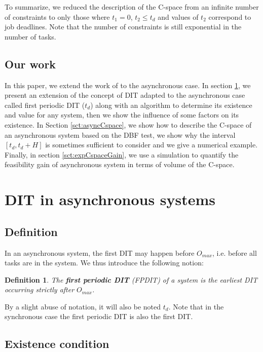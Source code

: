 \documentclass[conference]{IEEEtran}
\newtheorem{definition}{Definition}
\begin{document}
  To summarize, we reduced the description of the C-space from an infinite number
  of constraints to only those where $t_1 = 0$, $t_2 \leqslant t_d$ and
  values of $t_2$ correspond to job deadlines. Note that the number of
  constraints is still exponential in the number of tasks.

  \subsection{Our work}
    In this paper, we extend the work of \cite{george2009characterization} to the
    asynchronous case. In section \ref{sct:asyncDIT}, we present an extension of
    the concept of DIT adapted to the asynchronous case called first periodic DIT
    ($t_d$) along with an algorithm to determine its existence and value for any system,
    then we show the influence of some factors on its existence. In Section
    \ref{sct:asyncCspace}, we show how to describe the C-space of an asynchronous
    system based on the DBF test, we show why the interval $[t_d, t_d + H]$ is
    sometimes sufficient to consider and we give a numerical example.
    Finally, in section \ref{sct:expCspaceGain}, we use a simulation to quantify the feasibility
    gain of asynchronous system in terms of volume of the C-space.

\section{DIT in asynchronous systems}
  \label{sct:asyncDIT}

  \subsection{Definition}

    In an asynchronous system, the first DIT may happen before $O_{max}$, i.e. before all tasks are in the system. We thus introduce the following notion:

    \begin{definition}
      The \textbf{first periodic DIT} (FPDIT) of a system is the earliest DIT occurring
      strictly after $O_{max}$.
    \end{definition}

    By a slight abuse of notation, it will also be noted $t_d$. Note that in the
    synchronous case the first periodic DIT is also the first DIT.

  \subsection{Existence condition}
  \label{sct:FPDITexist}
\end{document}
